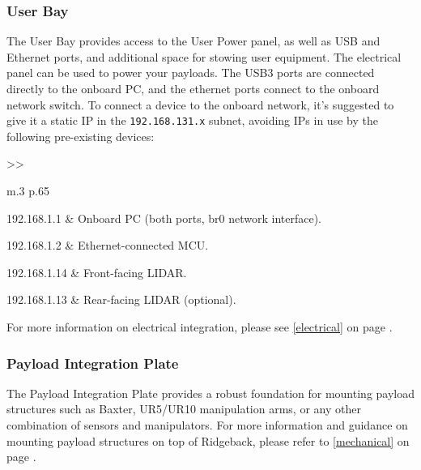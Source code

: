 \documentclass[]{clearpath-latex/clearpath-manual}
\begin{document}
\pagebreak[4]
\subsubsection{User Bay}\label{userbay}

The User Bay provides access to the User Power panel, as well as USB and Ethernet ports, and additional space for stowing user equipment.  The electrical panel can be used to power your payloads. The USB3 ports are connected directly to the onboard PC, and the ethernet ports connect to the onboard network switch. To connect a device to the onboard network, it's suggested to give it a static IP in the \lstinline{192.168.131.x} subnet, avoiding IPs in use by the following pre-existing devices:

\bgroup
\def\arraystretch{1.2}%
\begin{table}[h]
	\centering
	\begin{tabular}{>{}>{\raggedright}m{.3\textwidth} p{.65\textwidth}} \hline

	192.168.1.1 & Onboard PC (both ports, br0 network interface). \\ \hline

	192.168.1.2 & Ethernet-connected MCU. \\ \hline

	192.168.1.14 & Front-facing LIDAR. \\ \hline

	192.168.1.13 & Rear-facing LIDAR (optional). \\ \hline

	\end{tabular}
\newline
\caption{Ridgeback Onboard Network Devices}
\label{netdevs}
\end{table}
\egroup

For more information on electrical integration, please see \autoref{electrical} on page \pageref{electrical}.


\subsubsection{Payload Integration Plate}

The Payload Integration Plate provides a robust foundation for mounting payload structures such as Baxter, UR5/UR10 manipulation arms, or any other combination of sensors and manipulators.   For more information and guidance on mounting payload structures on top of Ridgeback, please refer to \autoref{mechanical} on page \pageref{mechanical}.
\end{document}
